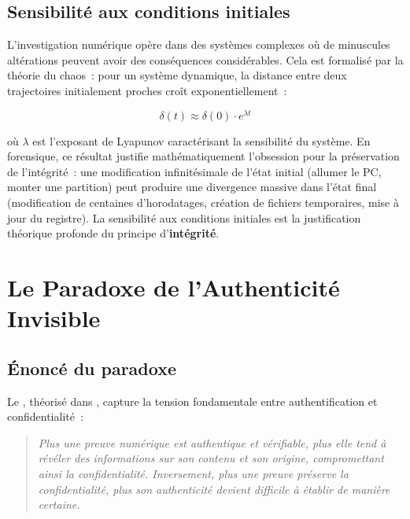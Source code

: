 \subsection{Sensibilité aux conditions initiales}

L'investigation numérique opère dans des systèmes complexes où de minuscules
altérations peuvent avoir des conséquences considérables. Cela est formalisé
par la théorie du chaos~: pour un système dynamique, la distance entre
deux trajectoires initialement proches croît exponentiellement~:

\begin{equation}
\delta(t) \approx \delta(0) \cdot e^{\lambda t}
\label{eq:lyapunov}
\end{equation}

où $\lambda$ est l'exposant de Lyapunov caractérisant la sensibilité du
système. En forensique, ce résultat justifie mathématiquement l'obsession
pour la préservation de l'intégrité~: une modification infinitésimale de
l'état initial (allumer le PC, monter une partition) peut produire
une divergence massive dans l'état final (modification de centaines
d'horodatages, création de fichiers temporaires, mise à jour du registre).
La sensibilité aux conditions initiales est la justification théorique
profonde du principe d'\textbf{intégrité}.

\section{Le Paradoxe de l'Authenticité Invisible}

\subsection{Énoncé du paradoxe}

Le , théorisé dans \cite{minka2025zknr}, capture
la tension fondamentale entre authentification et confidentialité~:

\begin{quotation}
\textit{Plus une preuve numérique est authentique et vérifiable, plus elle
tend à révéler des informations sur son contenu et son origine, compromettant
ainsi la confidentialité. Inversement, plus une preuve préserve la
confidentialité, plus son authenticité devient difficile à établir de
manière certaine.}
\end{quotation}

